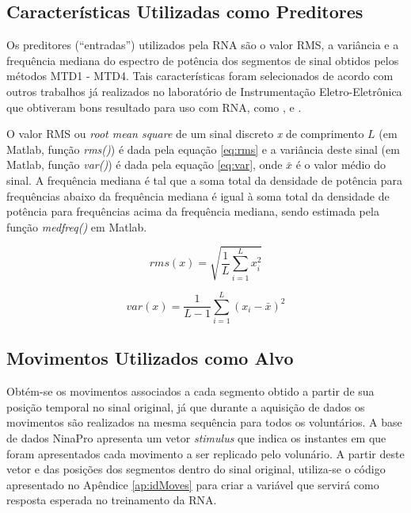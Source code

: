 

			\subsection{Características Utilizadas como Preditores}
Os preditores (``entradas'') utilizados pela RNA são o valor RMS, a variância e a frequência mediana do espectro de potência dos segmentos de sinal obtidos pelos métodos MTD1 - MTD4. Tais características foram selecionados de acordo com outros trabalhos já realizados no laboratório de Instrumentação Eletro-Eletrônica que obtiveram bons resultado para uso com RNA, como \cite{Favieiro2009}, \cite{Schons2014} e \cite{CeneXXXX}.

O valor RMS ou \emph{root mean square} de um sinal discreto \emph{x} de comprimento $L$ (em Matlab, função \emph{rms()}) é dada pela equação \ref{eq:rms} e a variância deste sinal (em Matlab, função \emph{var()}) é dada pela equação \ref{eq:var}, onde $\bar{x}$ é o valor médio do sinal. A frequência mediana é tal que a soma total da densidade de potência para frequências abaixo da frequência mediana é igual à soma total da densidade de potência para frequências acima da frequência mediana, sendo estimada pela função \emph{medfreq()} em Matlab.

\begin{equation}
	\label{eq:rms}
	rms(x) = \sqrt{\frac{1}{L}\sum\limits_{i=1}^{L}x_i^2} 
\end{equation}

\begin{equation}
	\label{eq:var}
	var(x) = \frac{1}{L-1}\sum\limits_{i=1}^{L}(x_i - \bar{x})^2
\end{equation}

			\subsection{Movimentos Utilizados como Alvo}
Obtém-se os movimentos associados a cada segmento obtido a partir de sua posição temporal no sinal original, já que durante a aquisição de dados os movimentos são realizados na mesma sequência para todos os voluntários. A base de dados NinaPro apresenta um vetor \emph{stimulus} que indica os instantes em que foram apresentados cada movimento a ser replicado pelo volunário. A partir deste vetor e das posições dos segmentos dentro do sinal original, utiliza-se o código apresentado no Apêndice \ref{ap:idMoves} para criar a variável que servirá como resposta esperada no treinamento da RNA. 


